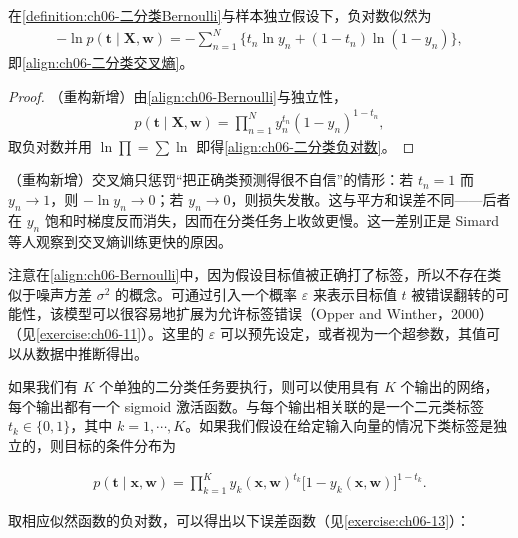 \documentclass[../../main.tex]{subfiles}
\begin{document}
\begin{proposition}[二分类的交叉熵误差]\label{proposition:ch06-二分类交叉熵}
在\cref{definition:ch06-二分类Bernoulli}与样本独立假设下，负对数似然为
\begin{align}
-\ln p(\boldsymbol{t}\mid\boldsymbol{X},\boldsymbol{w})=-\sum_{n=1}^{N}\bigl\{t_n\ln y_n+(1-t_n)\ln(1-y_n)\bigr\},
\label{align:ch06-二分类负对数}
\end{align}
即\eqref{align:ch06-二分类交叉熵}。
\end{proposition}

\begin{proof}
（重构新增）由\eqref{align:ch06-Bernoulli}与独立性，
\begin{align}
p(\boldsymbol{t}\mid\boldsymbol{X},\boldsymbol{w})=\prod_{n=1}^{N}y_n^{t_n}(1-y_n)^{1-t_n},
\end{align}
取负对数并用 $\ln\prod=\sum\ln$ 即得\eqref{align:ch06-二分类负对数}。
\end{proof}

\begin{remark}（重构新增）交叉熵只惩罚“把正确类预测得很不自信”的情形：若 $t_n=1$ 而 $y_n\to1$，则 $-\ln y_n\to0$；若 $y_n\to0$，则损失发散。这与平方和误差不同——后者在 $y_n$ 饱和时梯度反而消失，因而在分类任务上收敛更慢。这一差别正是 Simard 等人观察到交叉熵训练更快的原因。
\end{remark}

注意在\eqref{align:ch06-Bernoulli}中，因为假设目标值被正确打了标签，所以不存在类似于噪声方差 $\sigma^{2}$ 的概念。可通过引入一个概率 $\varepsilon$ 来表示目标值 $t$ 被错误翻转的可能性，该模型可以很容易地扩展为允许标签错误（Opper and Winther，2000）（见\cref{exercise:ch06-11}）。这里的 $\varepsilon$ 可以预先设定，或者视为一个超参数，其值可以从数据中推断得出。

如果我们有 $K$ 个单独的二分类任务要执行，则可以使用具有 $K$ 个输出的网络，每个输出都有一个 sigmoid 激活函数。与每个输出相关联的是一个二元类标签 $t_k\in\{0,1\}$，其中 $k=1,\cdots,K$。如果我们假设在给定输入向量的情况下类标签是独立的，则目标的条件分布为

\begin{align}
p(\boldsymbol{t}\mid\boldsymbol{x},\boldsymbol{w})=\prod_{k=1}^{K}y_k(\boldsymbol{x},\boldsymbol{w})^{t_k}\bigl[1-y_k(\boldsymbol{x},\boldsymbol{w})\bigr]^{1-t_k}.
\label{align:ch06-多标签分布}
\end{align}

取相应似然函数的负对数，可以得出以下误差函数（见\cref{exercise:ch06-13}）：
\end{document}
